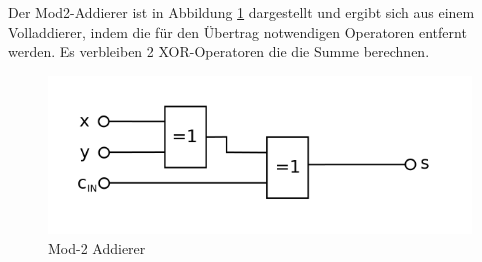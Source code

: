 Der Mod2-Addierer ist in Abbildung \ref{fig:lastadder} dargestellt und ergibt sich aus einem Volladdierer, indem die für den Übertrag notwendigen
Operatoren entfernt werden. Es verbleiben 2 XOR-Operatoren die die Summe berechnen.
\begin{figure}[!h]
  \centering
  \includegraphics[scale=1]{images/lastadder}
  \caption[Mod-2 Addierer]{Mod-2 Addierer\protect\footnotemark}
  \label{fig:lastadder}
\end{figure}
